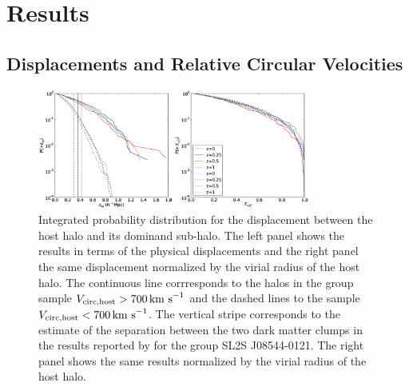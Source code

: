 \documentclass{emulateapj}
\newcommand{\kms}{{\ifmmode{{\mathrm{\,km\ s}^{-1}}}\else{\,km~s$^{-1}$}\fi}}
\begin{document}
\section{Results}
\label{sec:results}

\subsection{Displacements and Relative Circular Velocities}
\label{fig:displacement}

\begin{figure}
\begin{center}
\includegraphics[width=0.8\textwidth]{New_figures/figure_2.eps}
\end{center}
\caption{
  Integrated probability distribution for the displacement
  between the host halo and its dominand sub-halo. The left panel
  shows the results in terms of the physical displacements and the
  right panel the same displacement normalized by the virial radius of
  the host halo. The continuous line corrresponds to the halos in the
  group sample $V_{\rm circ,host}>700\kms$ and the dashed lines to the
  sample $V_{\rm circ,host}<700\kms$.
  The vertical stripe corresponds to the estimate of the separation
  between the two dark matter clumps in the results reported by
  \citet{Gastaldello} for the group SL2S J08544-0121. The right panel
  shows the same results normalized by the virial radius of the host
  halo.} 
\label{fig:displacement}
\end{figure}
\end{document}
